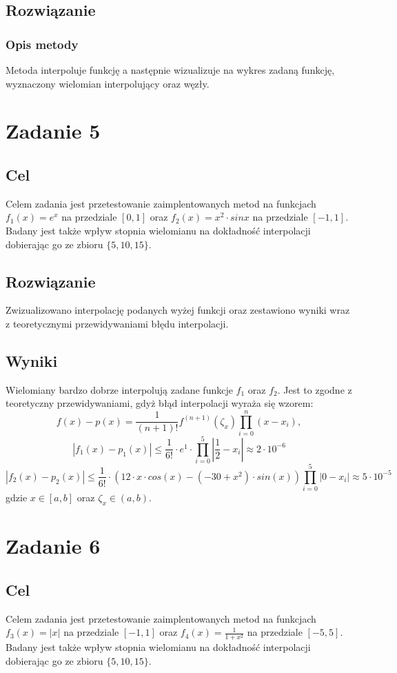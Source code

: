 \documentclass{article}
\begin{document}
\subsection{Rozwiązanie}
\subsubsection{Opis metody}
Metoda interpoluje funkcję a następnie wizualizuje na wykres zadaną funkcję, wyznaczony wielomian interpolujący oraz węzły.

\section{Zadanie 5}
\subsection{Cel}
Celem zadania jest przetestowanie zaimplentowanych metod na funkcjach $f_1(x) = e^x$ na przedziale $[0, 1]$ oraz $f_2(x) = x^2 \cdot sin{x}$ na przedziale $[-1, 1]$. 
Badany jest także wpływ stopnia wielomianu na dokładność interpolacji dobierając go ze zbioru ${\{5, 10, 15\}}$.

\subsection{Rozwiązanie}
Zwizualizowano interpolację podanych wyżej funkcji oraz zestawiono wyniki wraz z teoretycznymi przewidywaniami błędu interpolacji.

\subsection{Wyniki}
Wielomiany bardzo dobrze interpolują zadane funkcje $f_1$ oraz $f_2$. Jest to zgodne z teoretyczny przewidywaniami, gdyż błąd interpolacji wyraża się wzorem:
\[
    f(x) - p(x) = \frac{1}{(n+1)!}f^{(n+1)}(\zeta_x)\prod_{i=0}^{n}(x - x_i),
\]
\[
    |f_1(x) - p_1(x)| \leq \frac{1}{6!} \cdot e^1 \cdot \prod_{i=0}^{5}|\frac{1}{2} - x_i| \approx 2 \cdot 10^{-6}
\]
\[
    |f_2(x) - p_2(x)| \leq \frac{1}{6!} \cdot (12 \cdot x \cdot cos(x) - (-30 + x^2) \cdot sin(x)) \prod_{i=0}^{5}|0 - x_i| \approx 5 \cdot 10^{-5}
\]
gdzie $x \in [a, b]$ oraz $\zeta_x \in (a, b)$.


\section{Zadanie 6}
\subsection{Cel}
Celem zadania jest przetestowanie zaimplentowanych metod na funkcjach $f_3(x) = |x|$ na przedziale $[-1, 1]$ oraz $f_4(x) = \frac{1}{1 + x^2}$ na przedziale $[-5, 5]$.
Badany jest także wpływ stopnia wielomianu na dokładność interpolacji dobierając go ze zbioru ${\{5, 10, 15\}}$.
\end{document}
